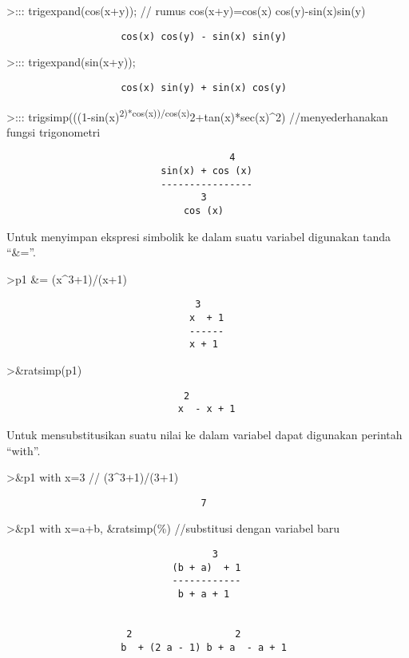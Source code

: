 \documentclass[
]{book}
\begin{document}
\textgreater::: trigexpand(cos(x+y)); // rumus cos(x+y)=cos(x) cos(y)-sin(x)sin(y)

\begin{verbatim}
                    cos(x) cos(y) - sin(x) sin(y)
\end{verbatim}

\textgreater::: trigexpand(sin(x+y));

\begin{verbatim}
                    cos(x) sin(y) + sin(x) cos(y)
\end{verbatim}

\textgreater::: trigsimp(((1-sin(x)\textsuperscript{2)*cos(x))/cos(x)}2+tan(x)*sec(x)\^{}2) //menyederhanakan fungsi trigonometri

\begin{verbatim}
                                       4
                           sin(x) + cos (x)
                           ----------------
                                  3
                               cos (x)
\end{verbatim}

Untuk menyimpan ekspresi simbolik ke dalam suatu variabel digunakan tanda ``\&=''.

\textgreater p1 \&= (x\^{}3+1)/(x+1)

\begin{verbatim}
                                 3
                                x  + 1
                                ------
                                x + 1
\end{verbatim}

\textgreater\&ratsimp(p1)

\begin{verbatim}
                               2
                              x  - x + 1
\end{verbatim}

Untuk mensubstitusikan suatu nilai ke dalam variabel dapat digunakan perintah ``with''.

\textgreater\&p1 with x=3 // (3\^{}3+1)/(3+1)

\begin{verbatim}
                                  7
\end{verbatim}

\textgreater\&p1 with x=a+b, \&ratsimp(\%) //substitusi dengan variabel baru

\begin{verbatim}
                                    3
                             (b + a)  + 1
                             ------------
                              b + a + 1


                     2                  2
                    b  + (2 a - 1) b + a  - a + 1
\end{verbatim}
\end{document}
